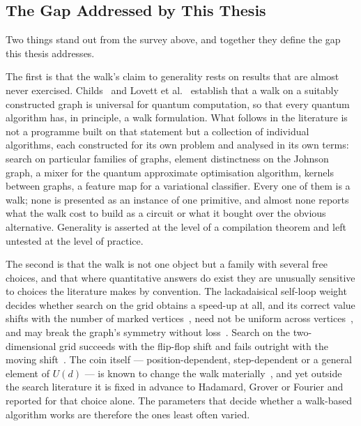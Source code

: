 \subsection{The Gap Addressed by This Thesis}
\label{sec:lr-gap}

Two things stand out from the survey above, and together they define the gap
this thesis addresses.

The first is that the walk's claim to generality rests on results that are
almost never exercised. Childs~\cite{PhysRevLett.102.180501} and Lovett et
al.~\cite{ett2010universal} establish that a walk on a suitably constructed
graph is universal for quantum computation, so that every quantum algorithm
has, in principle, a walk formulation. What follows in the literature is not
a programme built on that statement but a collection of individual
algorithms, each constructed for its own problem and analysed in its own
terms: search on particular families of graphs, element distinctness on the
Johnson graph, a mixer for the quantum approximate optimisation algorithm,
kernels between graphs, a feature map for a variational classifier. Every one
of them is a walk; none is presented as an instance of one primitive, and
almost none reports what the walk cost to build as a circuit or what it
bought over the obvious alternative. Generality is asserted at the level of
a compilation theorem and left untested at the level of practice.

The second is that the walk is not one object but a family with several free
choices, and that where quantitative answers do exist they are unusually
sensitive to choices the literature makes by convention. The lackadaisical
self-loop weight decides whether search on the grid obtains a speed-up at
all, and its correct value shifts with the number of marked
vertices~\cite{Nahimovs_2018}, need not be uniform across
vertices~\cite{Rhodes_2019}, and may break the graph's symmetry without
loss~\cite{Rapoza_2021}. Search on the two-dimensional grid succeeds with
the flip-flop shift and fails outright with the moving
shift~\cite{Ambainis_2004}. The coin itself --- position-dependent,
step-dependent or a general element of $U(d)$ --- is known to change the
walk materially~\cite{Tregenna_2003, Ahmad_2020, Panahiyan_2018, Li_2012,
Souza_2013}, and yet outside the search literature it is fixed in advance to
Hadamard, Grover or Fourier and reported for that choice alone. The
parameters that decide whether a walk-based algorithm works are therefore
the ones least often varied.

